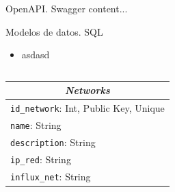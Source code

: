 \documentclass[aspectratio=169,xcolor=dvipsnames]{beamer}
\begin{document}
	
	\begin{frame}{OpenAPI. Swagger}
		content...
	\end{frame}
	
	
	\begin{frame}{Modelos de datos. SQL}
		
		\begin{itemize}
			\item asdasd
		\end{itemize}

		\begin{columns}
			\begin{column}{0.5\textwidth}
				\begin{table}[h!]
					\centering
					\begin{tabular}{|l|}
						\hline
						\multicolumn{1}{|c|}{\textit{\textbf{Networks}}} \\ \hline
						\texttt{id\_network}: Int, Public Key, Unique                 \\ \hline
						\texttt{name}: String                                     \\ \hline
						\texttt{description}: String                              \\ \hline
						\texttt{ip\_red}: String                                  \\ \hline
						\texttt{influx\_net}: String                              \\ \hline
					\end{tabular}
				\end{table}
			\end{column}
		

\end{columns}
\end{frame}
\end{document}
